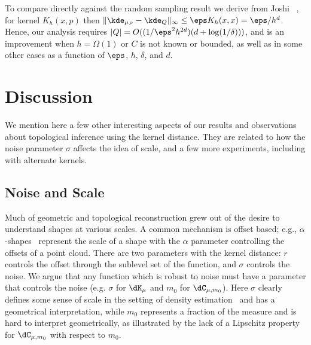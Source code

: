 \documentclass[11pt]{myclass}
\begin{document}
To compare directly against the random sampling result we derive from Joshi \etal~\cite{JoshiKommarajuPhillips2011}, for kernel $K_h(x,p)$ then $\|\kde_{\mu_P} - \kde_Q\|_\infty \leq \eps K_h(x,x) = \eps / h^d$.  Hence, our analysis requires $|Q| = O((1/\eps^2 h^{2d}) (d + \log(1/\delta)))$, and is an improvement when $h = \Omega(1)$ or $C$ is not known or bounded, as well as in some other cases as a function of $\eps$, $h$, $\delta$, and $d$.   





\section{Discussion}
\label{app:discuss}
We mention here a few other interesting aspects of our results and observations about topological inference using the kernel distance.  They are related to how the noise parameter $\sigma$ affects the idea of scale, and a few more experiments, including with alternate kernels.  


\subsection{Noise and Scale}
Much of geometric and topological reconstruction grew out of the desire to understand shapes at various scales.  A common mechanism is offset based; e.g., $\alpha$-shapes~\cite{Edelsbrunner1993} represent the scale of a shape with the $\alpha$ parameter controlling the offsets of a point cloud.  
There are two parameters with the kernel distance: $r$ controls the offset through the sublevel set of the function, and $\sigma$ controls the noise. 
We argue that any function which is robust to noise must have a parameter that controls the noise (e.g. $\sigma$ for $\dK_\mu$ and $m_0$ for $\dC_{\mu,m_0}$).
Here $\sigma$ clearly defines some sense of scale in the setting of density estimation~\cite{Sil86} and has a geometrical interpretation, while $m_0$ represents a fraction of the measure and is hard to interpret geometrically, as illustrated by the lack of a Lipschitz property for $\dC_{\mu,m_0}$ with respect to $m_0$.  
\end{document}
